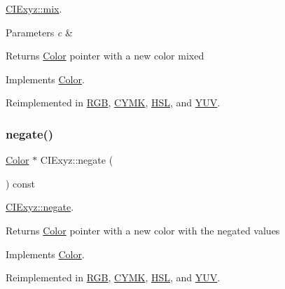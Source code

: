 \hyperlink{class_c_i_exyz_af8eeb48ade44beea43d023b36d263fc8}{C\+I\+Exyz\+::mix}. 


\begin{DoxyParams}{Parameters}
{\em c} & \\
\hline
\end{DoxyParams}
\begin{DoxyReturn}{Returns}
\hyperlink{class_color}{Color} pointer with a new color mixed 
\end{DoxyReturn}


Implements \hyperlink{class_color}{Color}.



Reimplemented in \hyperlink{class_r_g_b_aa022866e33474ab64f81d367c6b030b9}{R\+GB}, \hyperlink{class_c_y_m_k_adeb4691eafbb53e15538a3d829f59a14}{C\+Y\+MK}, \hyperlink{class_h_s_l_a08bcec2ca6961b7c6431d92a625c30a7}{H\+SL}, and \hyperlink{class_y_u_v_ab152a4ea37eaa67df0b38882c2099da3}{Y\+UV}.

\mbox{\label{class_c_i_exyz_a4a454df6cbb71f3fcfd2d1ea9d500d94}} 
\subsubsection{\texorpdfstring{negate()}{negate()}}
{\footnotesize\ttfamily \hyperlink{class_color}{Color} $\ast$ C\+I\+Exyz\+::negate (\begin{DoxyParamCaption}{ }\end{DoxyParamCaption}) const\hspace{0.3cm}{\ttfamily [virtual]}}



\hyperlink{class_c_i_exyz_a4a454df6cbb71f3fcfd2d1ea9d500d94}{C\+I\+Exyz\+::negate}. 

\begin{DoxyReturn}{Returns}
\hyperlink{class_color}{Color} pointer with a new color with the negated values 
\end{DoxyReturn}


Implements \hyperlink{class_color}{Color}.



Reimplemented in \hyperlink{class_r_g_b_a7aad38ac17ec3201c65f8f5e90637b69}{R\+GB}, \hyperlink{class_c_y_m_k_a397c0109e76ff6cc331b49e4b73623ef}{C\+Y\+MK}, \hyperlink{class_h_s_l_af681f885d11220b0588e8f969aa95e32}{H\+SL}, and \hyperlink{class_y_u_v_a079872ae88552066ce1abb39cc0a40de}{Y\+UV}.

